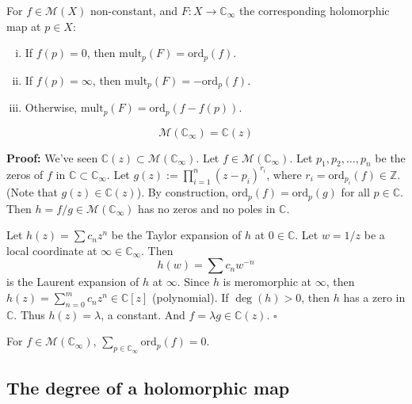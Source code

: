 \documentclass{article}
\begin{document}
\begin{lemma} 
For $f \in \mathcal{M}(X)$ non-constant, and $F: X \to \mathbb{C}_{\infty}$ the corresponding holomorphic map at $p \in X$:
\begin{enumerate}[i)]
    \item If $f(p)=0$, then $\text{mult}_p(F) = \text{ord}_p(f)$.
    \item If $f(p)=\infty$, then $\text{mult}_p(F) = -\text{ord}_p(f)$.
    \item Otherwise, $\text{mult}_p(F) = \text{ord}_p(f - f(p))$.
\end{enumerate}
\end{lemma}

\begin{theorem}  
$$\mathcal{M}(\mathbb{C}_{\infty})=\mathbb{C}(z)$$
\end{theorem}

\textbf{Proof:}
We've seen $\mathbb{C}(z) \subset \mathcal{M}(\mathbb{C}_{\infty})$. Let $f \in \mathcal{M}(\mathbb{C}_{\infty})$.
Let $p_1, p_2, \dots, p_n$ be the zeros of $f$ in $\mathbb{C} \subset \mathbb{C}_{\infty}$.
Let $g(z) := \prod_{i=1}^n (z-p_i)^{r_i}$, where $r_i = \text{ord}_{p_i}(f) \in \mathbb{Z}$.
(Note that $g(z) \in \mathbb{C}(z)$).
By construction, $\text{ord}_p(f) = \text{ord}_p(g)$ for all $p \in \mathbb{C}$. Then $h = f/g \in \mathcal{M}(\mathbb{C}_{\infty})$ has no zeros and no poles in $\mathbb{C}$.

Let $h(z) = \sum c_n z^n$ be the Taylor expansion of $h$ at $0 \in \mathbb{C}$.
Let $w = 1/z$ be a local coordinate at $\infty \in \mathbb{C}_{\infty}$. Then
$$
h(w) = \sum c_n w^{-n}
$$
is the Laurent expansion of $h$ at $\infty$.
Since $h$ is meromorphic at $\infty$, then $h(z) = \sum_{n=0}^m c_n z^n \in \mathbb{C}[z]$ (polynomial).
If $\deg(h) > 0$, then $h$ has a zero in $\mathbb{C}$. Thus $h(z) = \lambda$, a constant.
And $f = \lambda g \in \mathbb{C}(z)$.
\hfill $\square$

\begin{corollary}
For $f \in \mathcal{M}(\mathbb{C}_{\infty})$, $\sum_{p \in \mathbb{C}_{\infty}} \text{ord}_p(f) = 0$.
\end{corollary}

\subsection{The degree of a holomorphic map}
\end{document}
